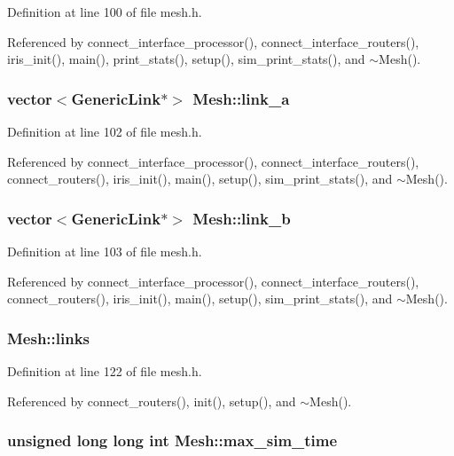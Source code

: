 Definition at line 100 of file mesh.h.

Referenced by connect\_\-interface\_\-processor(), connect\_\-interface\_\-routers(), iris\_\-init(), main(), print\_\-stats(), setup(), sim\_\-print\_\-stats(), and $\sim$Mesh().
\subsubsection[{link\_\-a}]{\setlength{\rightskip}{0pt plus 5cm}vector$<${\bf GenericLink}$\ast$$>$ {\bf Mesh::link\_\-a}}\label{classMesh_25aed9e44396cd39a521e647d8e95ed2}




Definition at line 102 of file mesh.h.

Referenced by connect\_\-interface\_\-processor(), connect\_\-interface\_\-routers(), connect\_\-routers(), iris\_\-init(), main(), setup(), sim\_\-print\_\-stats(), and $\sim$Mesh().
\subsubsection[{link\_\-b}]{\setlength{\rightskip}{0pt plus 5cm}vector$<${\bf GenericLink}$\ast$$>$ {\bf Mesh::link\_\-b}}\label{classMesh_8afcc482b97d3820e8249750c8a214c2}




Definition at line 103 of file mesh.h.

Referenced by connect\_\-interface\_\-processor(), connect\_\-interface\_\-routers(), connect\_\-routers(), iris\_\-init(), main(), setup(), sim\_\-print\_\-stats(), and $\sim$Mesh().
\subsubsection[{links}]{ {\bf Mesh::links}\hspace{0.3cm}{\tt  [private]}}\label{classMesh_3ca6cc96b42524fcf15371eff8d29508}




Definition at line 122 of file mesh.h.

Referenced by connect\_\-routers(), init(), setup(), and $\sim$Mesh().
\subsubsection[{max\_\-sim\_\-time}]{\setlength{\rightskip}{0pt plus 5cm}unsigned long long int {\bf Mesh::max\_\-sim\_\-time}}\label{classMesh_f81d45b09e24345365e6252a2243cc6b}




